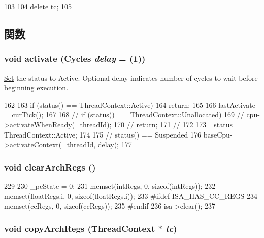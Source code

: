 \begin{DoxyCode}
103 {
104     delete tc;
105 }
\end{DoxyCode}


\subsection{関数}
\hypertarget{classSimpleThread_ab542a5cf9ce4b41042d61e42dfe3aeab}{
\subsubsection[{activate}]{\setlength{\rightskip}{0pt plus 5cm}void activate ({\bf Cycles} {\em delay} = {(1)})}}
\label{classSimpleThread_ab542a5cf9ce4b41042d61e42dfe3aeab}
\hyperlink{classSet}{Set} the status to Active. Optional delay indicates number of cycles to wait before beginning execution. 


\begin{DoxyCode}
162 {
163     if (status() == ThreadContext::Active)
164         return;
165 
166     lastActivate = curTick();
167 
168 //    if (status() == ThreadContext::Unallocated) {
169 //      cpu->activateWhenReady(_threadId);
170 //      return;
171 //   }
172 
173     _status = ThreadContext::Active;
174 
175     // status() == Suspended
176     baseCpu->activateContext(_threadId, delay);
177 }
\end{DoxyCode}
\hypertarget{classSimpleThread_ad5c88ea41846742bd8c70d9c50f31945}{
\subsubsection[{clearArchRegs}]{\setlength{\rightskip}{0pt plus 5cm}void clearArchRegs ()}}
\label{classSimpleThread_ad5c88ea41846742bd8c70d9c50f31945}



\begin{DoxyCode}
229     {
230         _pcState = 0;
231         memset(intRegs, 0, sizeof(intRegs));
232         memset(floatRegs.i, 0, sizeof(floatRegs.i));
233 #ifdef ISA_HAS_CC_REGS
234         memset(ccRegs, 0, sizeof(ccRegs));
235 #endif
236         isa->clear();
237     }
\end{DoxyCode}
\hypertarget{classSimpleThread_a01b372f805c92c90e6148b76d23d6236}{
\subsubsection[{copyArchRegs}]{\setlength{\rightskip}{0pt plus 5cm}void copyArchRegs ({\bf ThreadContext} $\ast$ {\em tc})}}
\label{classSimpleThread_a01b372f805c92c90e6148b76d23d6236}



